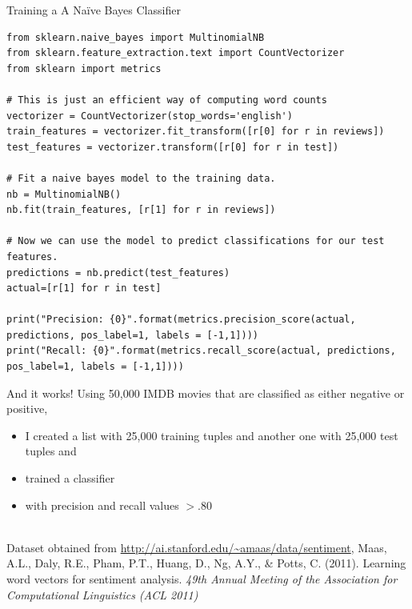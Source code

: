 \documentclass[compress]{beamer}
\begin{document}
\begin{frame}[fragile]{Training a A Naïve Bayes Classifier}
\begin{lstlisting}
from sklearn.naive_bayes import MultinomialNB
from sklearn.feature_extraction.text import CountVectorizer
from sklearn import metrics

# This is just an efficient way of computing word counts
vectorizer = CountVectorizer(stop_words='english')
train_features = vectorizer.fit_transform([r[0] for r in reviews])
test_features = vectorizer.transform([r[0] for r in test])

# Fit a naive bayes model to the training data.
nb = MultinomialNB()
nb.fit(train_features, [r[1] for r in reviews])

# Now we can use the model to predict classifications for our test features.
predictions = nb.predict(test_features)
actual=[r[1] for r in test]

print("Precision: {0}".format(metrics.precision_score(actual, predictions, pos_label=1, labels = [-1,1])))
print("Recall: {0}".format(metrics.recall_score(actual, predictions, pos_label=1, labels = [-1,1])))
\end{lstlisting}
\end{frame}
%


\begin{frame}{And it works!}
Using 50,000 IMDB movies that are classified as either negative or positive,
\begin{itemize}
	\item I created a list with 25,000 training tuples and another one with 25,000 test tuples and
	\item trained a classifier
	\item with precision and recall values $>.80$
\end{itemize}
~\\
\tiny{Dataset obtained from \url{http://ai.stanford.edu/~amaas/data/sentiment}, Maas, A.L., Daly, R.E., Pham, P.T., Huang, D., Ng, A.Y., \& Potts, C. (2011). Learning word vectors for sentiment analysis. \emph{49th Annual Meeting of the Association for Computational Linguistics (ACL 2011)}
}

\end{frame}
\end{document}
